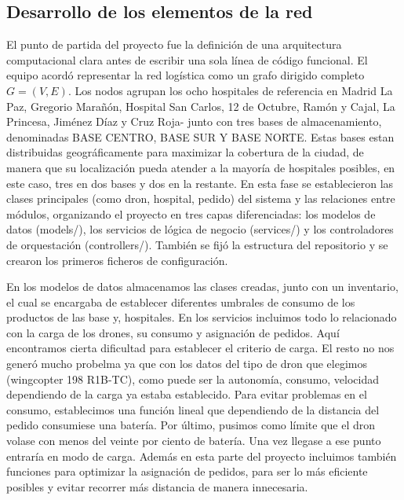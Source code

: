 \documentclass[11pt, a4paper]{article} %
\begin{document}
\subsection{Desarrollo de los elementos de la red}
El punto de partida del proyecto fue la definición de una arquitectura computacional clara antes de escribir una sola línea de código funcional. El equipo acordó representar la red logística como un grafo dirigido completo $G=(V,E)$. Los nodos agrupan los ocho hospitales de referencia en Madrid La Paz, Gregorio Marañón, Hospital San Carlos, 12 de Octubre, Ramón y Cajal, La Princesa, Jiménez Díaz y Cruz Roja- junto con tres bases de almacenamiento, denominadas BASE CENTRO, BASE SUR Y BASE NORTE. Estas bases estan distribuidas geográficamente para maximizar la cobertura de la ciudad, de manera que su localización pueda atender a la mayoría de hospitales posibles, en este caso, tres en dos bases y dos en la restante. En esta fase se establecieron las clases principales (como dron, hospital, pedido) del sistema y las relaciones entre módulos, organizando el proyecto en tres capas diferenciadas: los modelos de datos (models/), los servicios de lógica de negocio (services/) y los controladores de orquestación (controllers/). También se fijó la estructura del repositorio y se crearon los primeros ficheros de configuración.

En los modelos de datos almacenamos las clases creadas, junto con un inventario, el cual se encargaba de establecer diferentes umbrales de consumo de los productos de las base y, hospitales. En los servicios incluimos todo lo relacionado con la carga de los drones, su consumo y asignación de pedidos. Aquí encontramos cierta dificultad para establecer el criterio de carga. El resto no nos generó mucho probelma ya que con los datos del tipo de dron que elegimos (wingcopter 198 R1B-TC), como puede ser la autonomía, consumo, velocidad dependiendo de la carga ya estaba establecido. Para evitar problemas en el consumo, establecimos una función lineal que dependiendo de la distancia del pedido consumiese una batería. Por último, pusimos como límite que el dron volase con menos del veinte por ciento de batería. Una vez llegase a ese punto entraría en modo de carga. Además en esta parte del proyecto incluimos también funciones para optimizar la asignación de pedidos, para ser lo más eficiente posibles y evitar recorrer más distancia de manera innecesaria.
\end{document}

